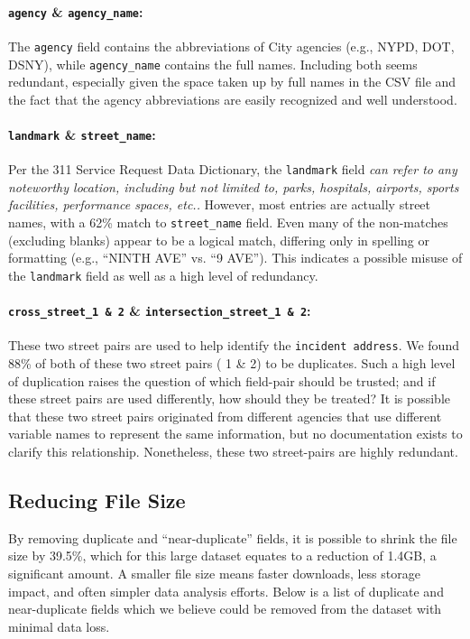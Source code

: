 \documentclass[linenumber]{jdsart}
\begin{document}
\paragraph{\texttt{agency} \& \texttt{agency\_name}:} The \texttt{agency} 
field contains the abbreviations of City agencies (e.g., NYPD, DOT, DSNY), 
while \texttt{agency\_name} contains the full names. Including both seems 
redundant, especially given the space taken up by full names in the 
CSV file and the fact that the agency abbreviations are 
easily recognized and well understood.

\paragraph{\texttt{landmark} \& \texttt{street\_name}:} Per the 
311 Service Request Data Dictionary, the \texttt{landmark} 
field \textit{can refer to any noteworthy location, 
including but not limited to, parks, hospitals, airports, sports facilities, 
performance spaces, etc..} However, most entries are actually 
street names, with a 62\% match to \texttt{street\_name} field. 
Even many of the non-matches (excluding blanks) appear to be 
a logical match, differing only in spelling or formatting 
(e.g., ``NINTH AVE'' vs. ``9 AVE''). This indicates a possible 
misuse of the \texttt{landmark} field as well as a high level of redundancy.

\paragraph{\texttt{cross\_street\_1 \& 2} \& \texttt{intersection\_street\_1 \& 2}:} These 
two street pairs are used to help identify the 
\texttt{incident address}. We found 88\% of both of these two 
street pairs ( 1 \& 2) to be duplicates. Such a high level of duplication 
raises the question of which field-pair should be trusted; 
and if these street pairs are used differently, how should they be treated?
It is possible that these two street pairs originated from different 
agencies that use different variable names to represent the same 
information, but no documentation exists to clarify this 
relationship. Nonetheless, these two street-pairs are highly redundant.


\subsection{Reducing File Size}
\label{sec:filesize}
By removing duplicate and ``near-duplicate'' fields, it is possible to 
shrink the file size by 39.5\%, which for this large dataset equates to 
a reduction of 1.4GB, a significant amount. A smaller file size 
means faster downloads, less storage impact, and often 
simpler data analysis efforts. Below is a list of duplicate 
and near-duplicate fields which we believe could be
removed from the dataset with minimal data loss. 
\end{document}
